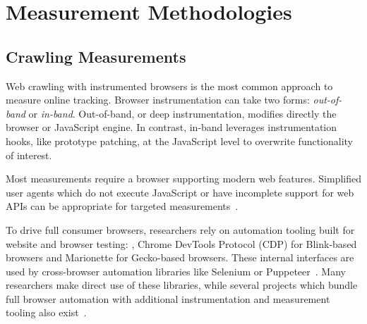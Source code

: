 \vspace{-2mm}
\section{Measurement Methodologies}
\label{sec:measurement-methodologies}

\vspace{-3mm}
\subsection{Crawling Measurements}
\label{sec:crawling}
\vspace{-2mm}

Web crawling with instrumented browsers is the most common approach to measure online tracking.
Browser instrumentation can take two forms: \textit{out-of-band} or \textit{in-band}. Out-of-band, or deep instrumentation, modifies directly the browser or JavaScript engine. In contrast, in-band leverages instrumentation hooks, like prototype patching, at the JavaScript level to overwrite functionality of interest.

 Most measurements require a browser supporting modern web features.
Simplified user agents which do not execute JavaScript or have incomplete support for web APIs can be appropriate for targeted measurements~\cite{apache-nutch}. 

 To drive full consumer browsers, researchers rely on automation tooling built for website and browser testing: \eg{}, Chrome DevTools Protocol (CDP) for Blink-based browsers and Marionette for Gecko-based browsers. These internal interfaces are used by cross-browser automation libraries like Selenium or Puppeteer~\cite{
cross-browser-testing-1-2020,cross-browser-testing-2-2021,puppeteer-support-firefox-2024}.
Many researchers make direct use of these libraries, while several projects which bundle full browser automation with additional instrumentation and measurement tooling also exist~\cite{englehardtOnlineTracking1millionsite2016,openwpm4StudiesUsing,mayerFourthpartyFourthpartyFourthParty2011,duckduckgoDuckduckgoTrackerradarcollectorModular2020,libertWebXrayPrivacySearch2024}.

